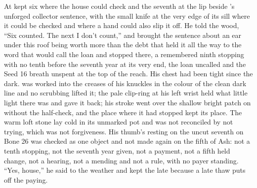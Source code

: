 At   kept six where the house could check and the seventh at the lip beside 's unforged collector sentence, with the small knife at the very edge of its sill where it could be checked and where a hand could also slip it off. He told the wood, “Six counted. The next I don't count,” and brought the sentence about an ear under this roof being worth more than the debt that held it all the way to the word that would call the loan and stopped there, a remembered ninth stopping with no tenth before the seventh year at its very end, the loan uncalled and the Seed 16 breath unspent at the top of the reach. His chest had been tight since the dark.  was worked into the creases of his knuckles in the colour of the clean dark line and no scrubbing lifted it; the pale clip-ring at his left wrist held what little light there was and gave it back; his stroke went over the shallow bright patch on  without the half-check, and the place where it had stopped kept its place. The warm loft stone lay cold in its unmarked pot and was not reconciled by not trying, which was not forgiveness. His thumb's resting on the uncut seventh on Bone 26 was checked as one object and not made again on the fifth of Ash: not a tenth stopping, not the seventh year given, not a payment, not a fifth held change, not a hearing, not a mending and not a rule, with no payer standing. “Yes, house,” he said to the weather and kept the late because a late thaw puts off the paying.

